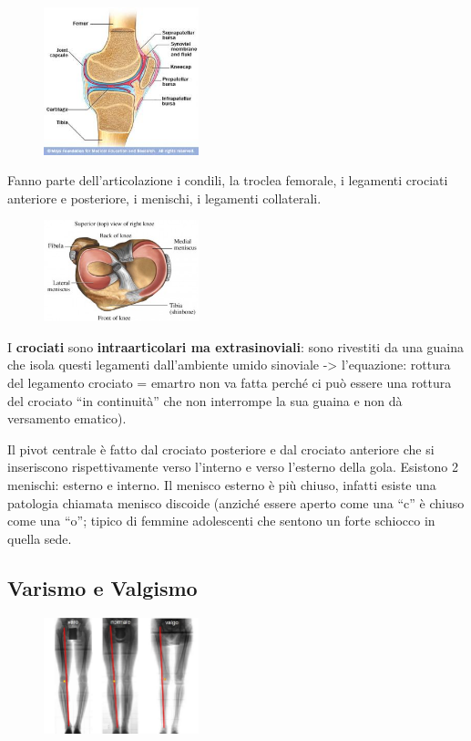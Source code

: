 \begin{figure}[!ht]
\centering
\includegraphics[width=0.4\textwidth]{009/image4.jpeg}
\end{figure}

Fanno parte dell'articolazione i condili, la troclea femorale, i legamenti crociati anteriore e posteriore, i menischi, i legamenti collaterali.

\begin{figure}[!ht]
\centering
\includegraphics[width=0.4\textwidth]{009/image5.jpeg}
\end{figure}
I
\textbf{crociati} sono \textbf{intraarticolari ma extrasinoviali}: sono rivestiti da una guaina che isola questi legamenti dall'ambiente umido sinoviale -> l'equazione: rottura del legamento crociato = emartro non va fatta perché ci può essere una rottura del crociato ``in continuità'' che non interrompe la sua guaina e non dà versamento ematico).

Il pivot centrale è fatto dal crociato posteriore e dal crociato anteriore che si inseriscono rispettivamente verso l'interno e verso l'esterno della gola. Esistono 2 menischi: esterno e interno. Il menisco esterno è più chiuso, infatti esiste una patologia chiamata menisco discoide (anziché essere aperto come una ``c'' è chiuso come una ``o''; tipico di femmine adolescenti che sentono un forte schiocco in quella sede.

\subsection{Varismo e Valgismo}

\begin{figure}[!ht]
\centering
\includegraphics[width=0.4\textwidth]{009/image6.jpeg}
\end{figure}

